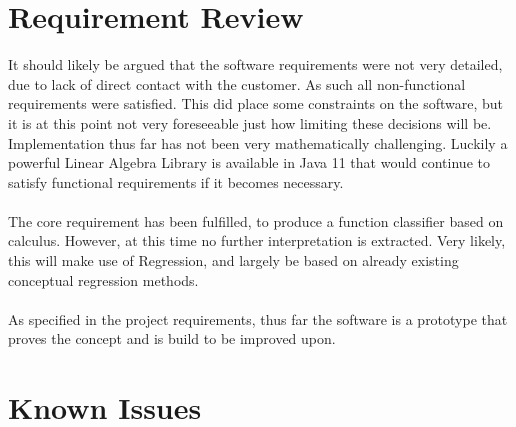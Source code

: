 \documentclass[main.tex]{subfiles}
\begin{document}
    
  \section{Requirement Review}
    
    It should likely be argued that the software requirements were not very detailed, due to lack of direct contact with the customer. As such all non-functional requirements were satisfied. This did place some constraints on the software, but it is at this point not very foreseeable just how limiting these decisions will be. Implementation thus far has not been very mathematically challenging. Luckily a powerful Linear Algebra Library is available in Java 11 \cite{} that would continue to satisfy functional requirements if it becomes necessary.
    \\\\
    The core requirement has been fulfilled, to produce a function classifier based on calculus. However, at this time no further interpretation is extracted. Very likely, this will make use of Regression, and largely be based on already existing conceptual regression methods.
    \\\\
    As specified in the project requirements, thus far the software is a prototype that proves the concept and is build to be improved upon.
    
  \section{Known Issues}
    
\end{document}
